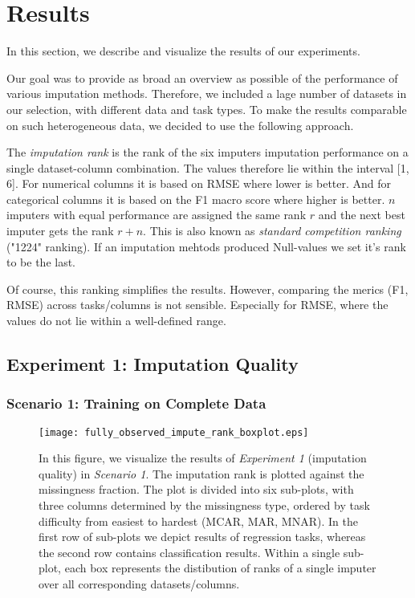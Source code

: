 \section{Results}
\label{sec:results}

In this section, we describe and visualize the results of our experiments.

Our goal was to provide as broad an overview as possible of the performance of various imputation methods. Therefore, we included a lage number of datasets in our selection, with different data and task types. To make the results comparable on such heterogeneous data, we decided to use the following approach.

The \textit{imputation rank} is the rank of the six imputers imputation performance on a single dataset-column combination. The values therefore lie within the interval [1, 6]. For numerical columns it is based on RMSE where lower is better. And for categorical columns it is based on the F1 macro score where higher is better. $n$ imputers with equal performance are assigned the same rank $r$ and the next best imputer gets the rank $r+n$. This is also known as \textit{standard competition ranking} ("1224" ranking). If an imputation mehtods produced Null-values we set it's rank to be the last.

Of course, this ranking simplifies the results. However, comparing the merics (F1, RMSE) across tasks/columns is not sensible. Especially for RMSE, where the values do not lie within a well-defined range.




\subsection{Experiment 1: Imputation Quality}


\subsubsection{Scenario 1: Training on Complete Data}


\begin{figure}\centering
    \texttt{[image: fully\_observed\_impute\_rank\_boxplot.eps]}
    \caption[Scenario 1 Imputation Ranks]{In this figure, we visualize the results of \textit{Experiment 1} (imputation quality) in \textit{Scenario 1}. The imputation rank is plotted against the missingness fraction. The plot is divided into six sub-plots, with three columns determined by the missingness type, ordered by task difficulty from easiest to hardest (MCAR, MAR, MNAR). In the first row of sub-plots we depict results of regression tasks, whereas the second row contains classification results. Within a single sub-plot, each box represents the distibution of ranks of a single imputer over all corresponding datasets/columns.}\label{fig:fully_observed_impute_rank_boxplot}
\end{figure}

